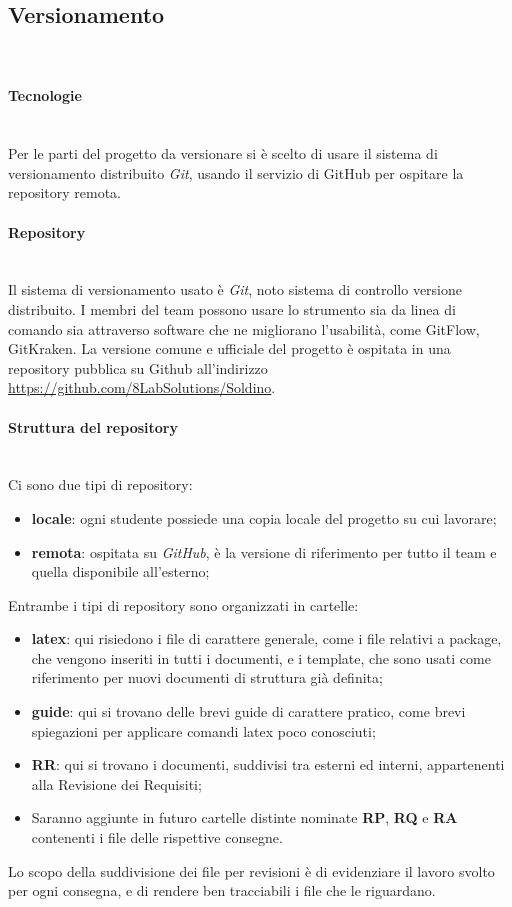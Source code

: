 	\subsection{Versionamento} \mbox{}\\
		\paragraph{Tecnologie} \mbox{}\\
		Per le parti del progetto da versionare si è scelto di usare il sistema di versionamento distribuito \textit{Git}, usando il servizio di GitHub per ospitare la repository remota.
		\paragraph{Repository} \mbox{}\\
		Il sistema di versionamento usato è \textit{Git}, noto sistema di controllo versione distribuito. I membri del team possono usare lo strumento sia da linea di comando sia attraverso software che ne migliorano l'usabilità, come GitFlow, GitKraken. La versione comune e ufficiale del progetto è  ospitata in una repository pubblica su Github all'indirizzo \url{https://github.com/8LabSolutions/Soldino}.
		\paragraph{Struttura del repository} \mbox{}\\
		Ci sono due tipi di repository:
		\begin{itemize}
			\item \textbf{locale}: ogni studente possiede una copia locale del progetto su cui lavorare;
			\item \textbf{remota}: ospitata su \textit{GitHub}, è la versione di riferimento per tutto il team e quella disponibile all'esterno;
		\end{itemize}						
		Entrambe i tipi di repository sono organizzati in cartelle:
		\begin{itemize}
			\item \textbf{latex}: qui risiedono i file di carattere generale, come i file relativi a package, che vengono inseriti in tutti i documenti, e i template, che sono usati come riferimento per nuovi documenti di struttura già definita;
			\item \textbf{guide}: qui si trovano delle brevi guide di carattere pratico, come brevi spiegazioni per applicare comandi latex poco conosciuti;
			\item \textbf{RR}: qui si trovano i documenti, suddivisi tra esterni ed interni, appartenenti alla Revisione dei Requisiti;
			\item Saranno aggiunte in futuro cartelle distinte nominate \textbf{RP}, \textbf{RQ} e \textbf{RA} contenenti i file delle rispettive consegne.
		\end{itemize}
		Lo scopo della suddivisione dei file per revisioni è di evidenziare il lavoro svolto per ogni consegna, e di rendere ben tracciabili i file che le riguardano.
